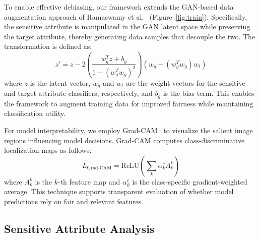 \documentclass[sigconf]{acmart}
\begin{document}
To enable effective debiasing, our framework extends the GAN-based data augmentation approach of Ramaswamy et al.~\cite{DBLP:conf/cvpr/RamaswamyKR21} (Figure~\ref{fig:train}). Specifically, the sensitive attribute is manipulated in the GAN latent space while preserving the target attribute, thereby generating data samples that decouple the two. The transformation is defined as:
\[
z' = z - 2 \left( \frac{w_g^T z + b_g}{1 - (w_g^T w_g)^2} \right) (w_g - (w_g^T w_g) w_t)
\]
where $z$ is the latent vector, $w_g$ and $w_t$ are the weight vectors for the sensitive and target attribute classifiers, respectively, and $b_g$ is the bias term. This enables the framework to augment training data for improved fairness while maintaining classification utility.

For model interpretability, we employ Grad-CAM~\cite{DBLP:conf/iccv/SelvarajuCDVPB17} to visualize the salient image regions influencing model decisions. Grad-CAM computes class-discriminative localization maps as follows:
\[
L_{\text{Grad-CAM}} = \text{ReLU} \left( \sum_k \alpha_k^c A_k^k \right)
\]
where $A_k^k$ is the $k$-th feature map and $\alpha_k^c$ is the class-specific gradient-weighted average. This technique supports transparent evaluation of whether model predictions rely on fair and relevant features.





\subsection{Sensitive Attribute Analysis}
\end{document}
